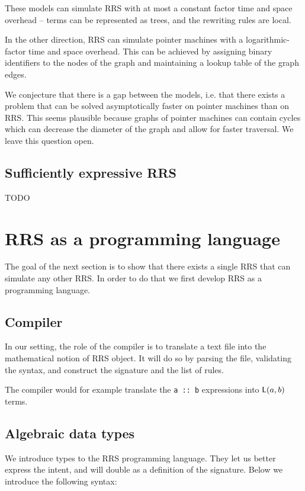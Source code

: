 \documentclass[11pt]{article}
\begin{document}
These models can simulate RRS with at most a constant factor time and space overhead
-- terms can be represented as trees, and the rewriting rules are local.

In the other direction, RRS can simulate pointer machines with a logarithmic-factor
time and space overhead. This can be achieved by assigning binary identifiers to the
nodes of the graph and maintaining a lookup table of the graph edges.

We conjecture that there is a gap between the models, i.e. that there exists a problem
that can be solved asymptotically faster on pointer machines than on RRS. This seems
plausible because graphs of pointer machines can contain cycles which can
decrease the diameter of the graph and allow for faster traversal. We leave
this question open.

\subsection{Sufficiently expressive RRS}

TODO

\section{RRS as a programming language}

The goal of the next section is to show that there exists a single RRS that can
simulate any other RRS. In order to do that we first develop RRS as a programming
language.

\subsection{Compiler}

In our setting, the role of the compiler is to translate a text file into the
mathematical notion of RRS object. It will do so by parsing the file, validating
the syntax, and construct the signature and the list of rules.

\begin{example}
The compiler would for example translate the \lstinline|a :: b| expressions into
$\mathsf{L}(a, b)$ terms.
\end{example}

\subsection{Algebraic data types}

We introduce types to the RRS programming language. They let us better express the
intent, and will double as a definition of the signature.
Below we introduce the following syntax:
\end{document}
